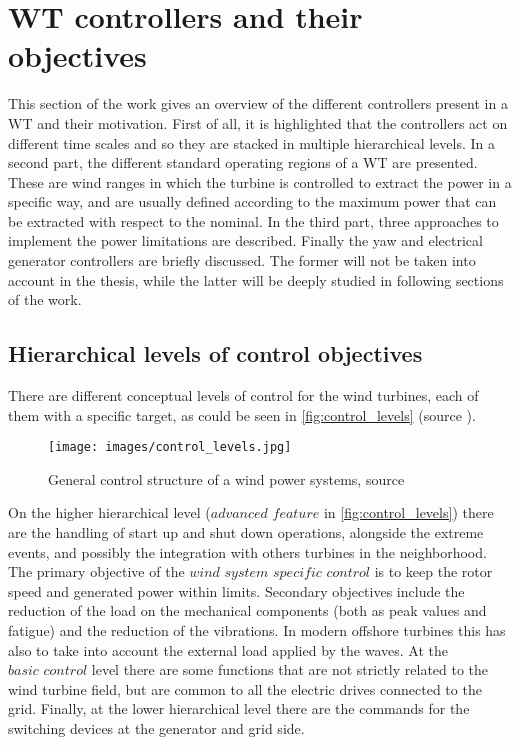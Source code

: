 \section{WT controllers and their objectives} \label{sec:control_objective}
This section of the work gives an overview of the different controllers present in a WT and their motivation. First of all, it is highlighted that the controllers act on different time scales and so they are stacked in multiple hierarchical levels. In a second part, the different standard operating regions of a WT are presented. These are wind ranges in which the turbine is controlled to extract the power in a specific way, and are usually defined according to the maximum power that can be extracted with respect to the nominal. In the third part, three approaches to implement the power limitations are described. Finally the yaw and electrical generator controllers are briefly discussed. The former will not be taken into account in the thesis, while the latter will be deeply studied in following sections of the work.  

\subsection{Hierarchical levels of control objectives}
There are different conceptual levels of control for the wind turbines, each of them with a specific target, as could be seen in \autoref{fig:control_levels} (source \cite{9535421}).
\begin{figure}[htb]
  \centering
  \texttt{[image: images/control\_levels.jpg]}
  \caption{General control structure of a wind power systems,  source \cite{9535421}}
  \label{fig:control_levels}
\end{figure}

On the higher hierarchical level ($\textit{advanced feature}$ in \autoref{fig:control_levels}) there are the handling of start up and shut down operations, alongside the extreme events, and possibly the integration with others turbines in the neighborhood. The primary objective of the $\textit{wind system specific control}$ is to keep the rotor speed and generated power within limits. Secondary objectives include the reduction of the load on the mechanical components (both as peak values and fatigue) and the reduction of the vibrations. In modern offshore turbines this has also to take into account the external load applied by the waves. At the $\textit{basic control}$ level there are some functions that are not strictly related to the wind turbine field, but are common to all the electric drives connected to the grid. Finally, at the lower hierarchical level there are the commands for the switching devices at the generator and grid side. 

